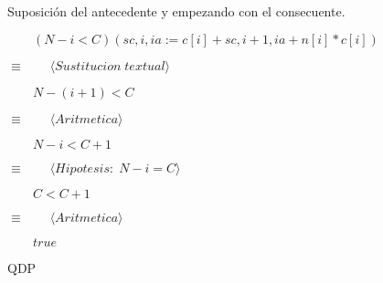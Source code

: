 \documentclass{article}
\begin{document}
Suposición del antecedente y empezando con el consecuente. \par 

$\qquad (N-i<C)(sc, i, ia := c[i]+sc, i + 1, ia+n[i]*c[i])$ \par 
$\equiv  \qquad \langle Sustitucion \; textual \rangle$ \par 
$\qquad N-(i+1)<C$ \par 
$\equiv  \qquad \langle Aritmetica \rangle$ \par 
$\qquad N-i<C+1$ \par 
$\equiv  \qquad \langle Hipotesis: \; N-i=C \rangle$ \par 
$\qquad C<C+1$ \par 
$\equiv  \qquad \langle Aritmetica \rangle$ \par 
$\qquad true$ \par 

QDP
\end{document}
